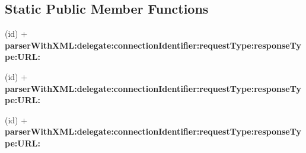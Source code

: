 \subsection*{\-Static \-Public \-Member \-Functions}
\begin{DoxyCompactItemize}
\item 
\hypertarget{interface_m_g_twitter_lib_x_m_l_parser_a9cc970de520524708a7033bfa4841e29}{
(id) + {\bfseries parser\-With\-X\-M\-L\-:delegate\-:connection\-Identifier\-:request\-Type\-:response\-Type\-:\-U\-R\-L\-:}}
\label{interface_m_g_twitter_lib_x_m_l_parser_a9cc970de520524708a7033bfa4841e29}

\item 
\hypertarget{interface_m_g_twitter_lib_x_m_l_parser_a9cc970de520524708a7033bfa4841e29}{
(id) + {\bfseries parser\-With\-X\-M\-L\-:delegate\-:connection\-Identifier\-:request\-Type\-:response\-Type\-:\-U\-R\-L\-:}}
\label{interface_m_g_twitter_lib_x_m_l_parser_a9cc970de520524708a7033bfa4841e29}

\item 
\hypertarget{interface_m_g_twitter_lib_x_m_l_parser_a9cc970de520524708a7033bfa4841e29}{
(id) + {\bfseries parser\-With\-X\-M\-L\-:delegate\-:connection\-Identifier\-:request\-Type\-:response\-Type\-:\-U\-R\-L\-:}}
\label{interface_m_g_twitter_lib_x_m_l_parser_a9cc970de520524708a7033bfa4841e29}

\end{DoxyCompactItemize}
